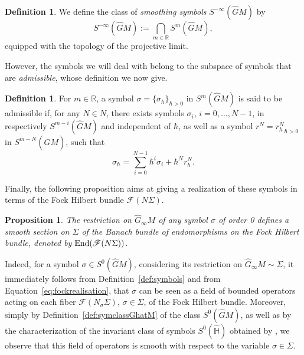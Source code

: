 \documentclass[12pt,a4paper]{amsart}
\theoremstyle{plain}
\newtheorem{proposition}[theorem]{Proposition}
\theoremstyle{definition}
\newtheorem{definition}[theorem]{Definition}
\theoremstyle{remark}
\numberwithin{equation}{section}
\theoremstyle{definition}
\def\R{{\mathbb R}}%
\def \Heis{\mathbb{H}}
\def \Ghat{\widehat{G}}
\def \Hhat{\widehat{\Heis}}
\numberwithin{equation}{section}
\begin{document}
\begin{definition}
\label{def:smoothsym}
    We define the class of \emph{smoothing symbols} $S^{-\infty}(\Ghat M)$ by
    \begin{equation*}
        S^{-\infty}(\Ghat M) := \bigcap_{m\in\R} S^m(\Ghat M),
    \end{equation*}
    equipped with the topology of the projective limit.
\end{definition}

However, the symbols we will deal with belong to the subspace of symbols that are \emph{admissible}, whose definition we now give.

\begin{definition}
    \label{def:symadmissible}
    For $m\in \R$, a symbol $\sigma = \{\sigma_\hbar\}_{\hbar>0}$ in $S^m(\Ghat M)$ is said to be admissible if, for any $N\in N$, there exists symbols $\sigma_i$, $i= 0,\dots,N-1$, in respectively $S^{m-i}(\Ghat M)$ and independent of $\hbar$, as well as a symbol $r^N = {r_\hbar^N}_{\hbar>0}$ in $S^{m-N}(\Ghat M)$, such that
    \begin{equation*}
        \sigma_\hbar = \sum_{i=0}^{N-1}\hbar^i \sigma_i + \hbar^Nr_\hbar^N.
    \end{equation*}
\end{definition}

Finally, the following proposition aims at giving a realization of these symbols in terms of the Fock Hilbert bundle $\mathcal{F}(N\Sigma)$. 

\begin{proposition}
    The restriction on $\Ghat_\infty M$ of any symbol $\sigma$ of order 0 defines a smooth section on $\Sigma$ of the Banach bundle of endomorphisms on the Fock Hilbert bundle, denoted by ${\rm End}(\mathscr{F}(N\Sigma))$.
\end{proposition}

Indeed, for a symbol $\sigma \in S^0(\Ghat M)$, considering its restriction on $\Ghat_\infty M\sim\Sigma$, it immediately follows from Definition~\ref{def:symbols} and from Equation~\eqref{eq:fockrealisation}, that $\sigma$ can be seen as a field of bounded operators acting on each fiber $\mathcal{F}(N_\sigma \Sigma)$, $\sigma\in \Sigma$, of the Fock Hilbert bundle. Moreover, simply by Definition~\ref{def:symclassGhatM} of the class $S^0(\Ghat M)$, as well as by the characterization of the invariant class of symbols $S^0(\Hhat)$ obtained by \cite[Theorem 6.5.1]{FR}, we observe that this field of operators is smooth with respect to the variable $\sigma \in \Sigma$.
\end{document}
